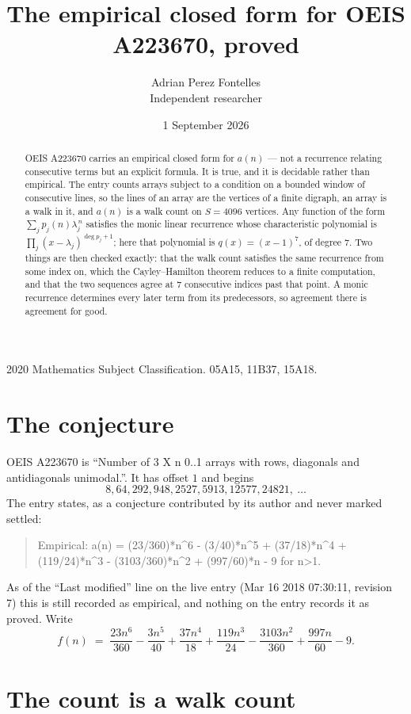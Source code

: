 \documentclass[11pt,a4paper]{article}
\title{The empirical closed form for OEIS A223670, proved}
\author{Adrian Perez Fontelles\\ \small Independent researcher}
\date{1 September 2026}
\theoremstyle{plain}
\theoremstyle{definition}
\begin{document}
\maketitle

\begin{abstract}
OEIS A223670 carries an empirical closed form for $a(n)$ --- not a recurrence relating
consecutive terms but an explicit formula. It is true, and it is decidable rather than
empirical. The entry counts arrays subject to a condition on a bounded window of consecutive lines, so the lines of an array are the
vertices of a finite digraph, an array is a walk in it, and $a(n)$ is a walk count on
$S=4096$ vertices. Any function of the form $\sum_j p_j(n)\lambda_j^{\,n}$ satisfies the
monic linear recurrence whose characteristic polynomial is
$\prod_j(x-\lambda_j)^{\deg p_j+1}$; here that polynomial is $q(x)=(x-1)^{7}$, of degree
$7$. Two things are then checked exactly: that the walk count satisfies the same
recurrence from some index on, which the Cayley--Hamilton theorem reduces to a finite
computation, and that the two sequences agree at $7$ consecutive indices past that
point. A monic recurrence determines every later term from its predecessors, so agreement
there is agreement for good.
\end{abstract}

\noindent\small 2020 Mathematics Subject Classification. 05A15, 11B37, 15A18.\normalsize

\section{The conjecture}

OEIS A223670 is ``Number of 3 X n 0..1 arrays with rows, diagonals and antidiagonals unimodal.''. It has offset $1$ and begins
\[
8, 64, 292, 948, 2527, 5913, 12577, 24821,\ \dots
\]
The entry states, as a conjecture contributed by its author and never marked settled:
\begin{quote}
Empirical: a(n) = (23/360)*n\^{}6 - (3/40)*n\^{}5 + (37/18)*n\^{}4 + (119/24)*n\^{}3 - (3103/360)*n\^{}2 + (997/60)*n - 9 for n>1.
\end{quote}
As of the ``Last modified'' line on the live entry (Mar 16 2018 07:30:11, revision 7) this is still
recorded as empirical, and nothing on the entry records it as proved. Write
\[
f(n)\;=\;\frac{23 n^{6}}{360} - \frac{3 n^{5}}{40} + \frac{37 n^{4}}{18} + \frac{119 n^{3}}{24} - \frac{3103 n^{2}}{360} + \frac{997 n}{60} - 9.
\]

\section{The count is a walk count}
\end{document}

